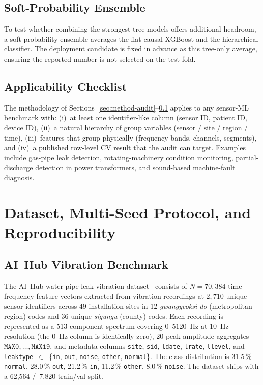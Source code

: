 \documentclass[3p,times,authoryear]{elsarticle}
\theoremstyle{remark}
\begin{document}
\subsection{Soft-Probability Ensemble}\label{sec:method-ensemble}

To test whether combining the strongest tree models offers
additional headroom, a soft-probability ensemble averages the
flat causal XGBoost and the hierarchical classifier. The
deployment candidate is fixed in advance as this tree-only
average, ensuring the reported number is not selected on the
test fold.

\subsection{Applicability Checklist}\label{sec:method-checklist}

The methodology of Sections~\ref{sec:method-audit}--\ref{sec:method-ensemble}
applies to any sensor-ML benchmark with: (i)~at least one
identifier-like column (sensor ID, patient ID, device ID),
(ii)~a natural hierarchy of group variables (sensor / site /
region / time), (iii)~features that group physically (frequency
bands, channels, segments), and (iv)~a published row-level CV
result that the audit can target. Examples include gas-pipe
leak detection, rotating-machinery condition monitoring,
partial-discharge detection in power transformers, and
sound-based machine-fault diagnosis.

\section{Dataset, Multi-Seed Protocol, and Reproducibility}\label{sec:setup}

\subsection{AI~Hub Vibration Benchmark}

The AI~Hub water-pipe leak vibration
dataset~\cite{aihub2022dataset,lee2023leak} consists of
$N = 70{,}384$ time-frequency feature vectors extracted from
vibration recordings at $2{,}710$ unique sensor identifiers
across 49 installation sites in 12 \textit{gwangyeoksi-do} (metropolitan-region)
codes and 36 unique \textit{sigungu} (county) codes. Each recording is
represented as a 513-component spectrum covering
$0$--$5120$~Hz at 10~Hz resolution (the 0~Hz column is
identically zero), 20 peak-amplitude aggregates
$\texttt{MAX0},\dots,\texttt{MAX19}$, and metadata columns
\texttt{site}, \texttt{sid}, \texttt{ldate}, \texttt{lrate},
\texttt{llevel}, and \texttt{leaktype}~$\in$~\{\texttt{in},
\texttt{out}, \texttt{noise}, \texttt{other}, \texttt{normal}\}.
The class distribution is 31.5\,\% \texttt{normal}, 28.0\,\%
\texttt{out}, 21.2\,\% \texttt{in}, 11.2\,\% \texttt{other},
8.0\,\% \texttt{noise}. The dataset ships with a 62{,}564
/~7{,}820 train/val split.
\end{document}
